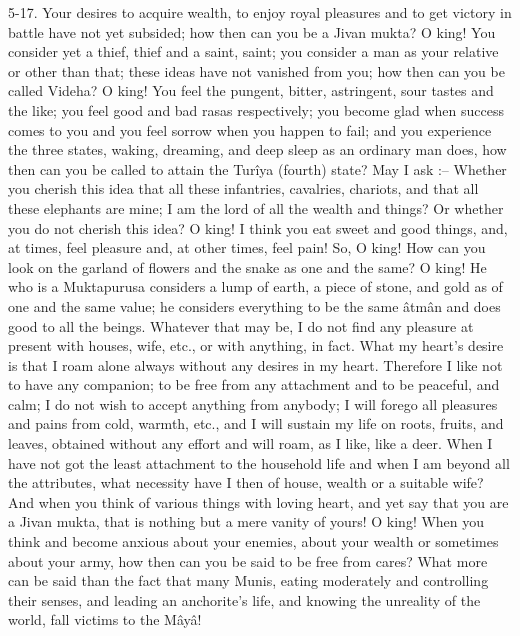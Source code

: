 5-17. Your desires to acquire wealth, to enjoy royal pleasures and to get victory in battle have not yet subsided; how then can you be a Jivan mukta? O king! You consider yet a thief, thief and a saint, saint; you consider a man as your relative or other than that; these ideas have not vanished from you; how then can you be called Videha? O king! You feel the pungent, bitter, astringent, sour tastes and the like; you feel good and bad rasas respectively; you become glad when success comes to you and you feel sorrow when you happen to fail; and you experience the three states, waking, dreaming, and deep sleep as an ordinary man does, how then can you be called to attain the Tur\^iya (fourth) state? May I ask :-- Whether you cherish this idea that all these infantries, cavalries, chariots, and that all these elephants are mine; I am the lord of all the wealth and things? Or whether you do not cherish this idea? O king! I think you eat sweet and good things, and, at times, feel pleasure and, at other times, feel pain! So, O king! How can you look on the garland of flowers and the snake as one and the same? O king! He who is a Muktapurusa considers a lump of earth, a piece of stone, and gold as of one and the same value; he considers everything to be the same \^atm\^an and does good to all the beings. Whatever that may be, I do not find any pleasure at present with houses, wife, etc., or with anything, in fact. What my heart’s desire is that I roam alone always without any desires in my heart. Therefore I like not to have any companion; to be free from any attachment and to be peaceful, and calm; I do not wish to accept anything from anybody; I will forego all pleasures and pains from cold, warmth, etc., and I will sustain my life on roots, fruits, and leaves, obtained without any effort and will roam, as I like, like a deer. When I have not got the least attachment to the household life and when I am beyond all the attributes, what necessity have I then of house, wealth or a suitable wife? And when you think of various things with loving heart, and yet say that you are a Jivan mukta, that is nothing but a mere vanity of yours! O king! When you think and become anxious about your enemies, about your wealth or sometimes about your army, how then can you be said to be free from cares? What more can be said than the fact that many Munis, eating moderately and controlling their senses, and leading an anchorite's life, and knowing the unreality of the world, fall victims to the M\^ay\^a!

